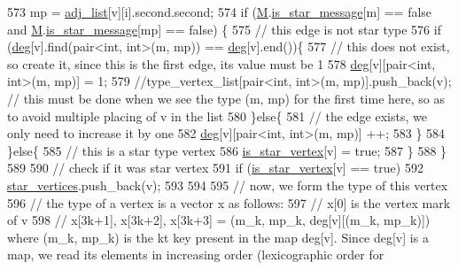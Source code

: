 \begin{DoxyCode}
573       mp = \hyperlink{classcolored__graph_a45dce16965079286cf3f41a54a1b2ea4}{adj\_list}[v][i].second.second;
574       \textcolor{keywordflow}{if} (\hyperlink{classcolored__graph_ab72c568fe12f7c849ca6bffb145aec47}{M}.\hyperlink{classgraph__message_a55ff5531a0043106369e84a7bc45e22d}{is\_star\_message}[m] == \textcolor{keyword}{false} and \hyperlink{classcolored__graph_ab72c568fe12f7c849ca6bffb145aec47}{M}.\hyperlink{classgraph__message_a55ff5531a0043106369e84a7bc45e22d}{is\_star\_message}[mp] == \textcolor{keyword}{false})
      \{
575         \textcolor{comment}{// this edge is not star type}
576         \textcolor{keywordflow}{if} (\hyperlink{classcolored__graph_ae3269d35c1b022bc70d195bebd4e1b8a}{deg}[v].find(pair<int, int>(m, mp)) == \hyperlink{classcolored__graph_ae3269d35c1b022bc70d195bebd4e1b8a}{deg}[v].end())\{
577           \textcolor{comment}{// this does not exist, so create it, since this is the first edge, its value must be 1}
578           \hyperlink{classcolored__graph_ae3269d35c1b022bc70d195bebd4e1b8a}{deg}[v][pair<int, int>(m, mp)] = 1;
579           \textcolor{comment}{//type\_vertex\_list[pair<int, int>(m, mp)].push\_back(v); // this must be done when we see the type
       (m, mp) for the first time here, so as to avoid multiple placing of v in the list }
580         \}\textcolor{keywordflow}{else}\{
581           \textcolor{comment}{// the edge exists, we only need to increase it by one}
582           \hyperlink{classcolored__graph_ae3269d35c1b022bc70d195bebd4e1b8a}{deg}[v][pair<int, int>(m, mp)] ++;
583         \}
584       \}\textcolor{keywordflow}{else}\{
585         \textcolor{comment}{// this is a star type vertex}
586         \hyperlink{classcolored__graph_ad41163e970530c7e45878d299f0dc961}{is\_star\_vertex}[v] = \textcolor{keyword}{true};
587       \}
588     \}
589 
590     \textcolor{comment}{// check if it was star vertex}
591     \textcolor{keywordflow}{if} (\hyperlink{classcolored__graph_ad41163e970530c7e45878d299f0dc961}{is\_star\_vertex}[v] == \textcolor{keyword}{true})
592       \hyperlink{classcolored__graph_ab7ee8d717abde7ad7467ef695038f574}{star\_vertices}.push\_back(v);
593 
594 
595     \textcolor{comment}{// now, we form the type of this vertex}
596     \textcolor{comment}{// the type of a vertex is a vector x as follows:}
597     \textcolor{comment}{// x[0] is the vertex mark of v}
598     \textcolor{comment}{// x[3k+1], x[3k+2], x[3k+3] = (m\_k, mp\_k, deg[v][(m\_k, mp\_k)]) where (m\_k, mp\_k) is the kt key present
       in the map deg[v]. Since deg[v] is a map, we read its elements in increasing order (lexicographic order for
}
\end{DoxyCode}
